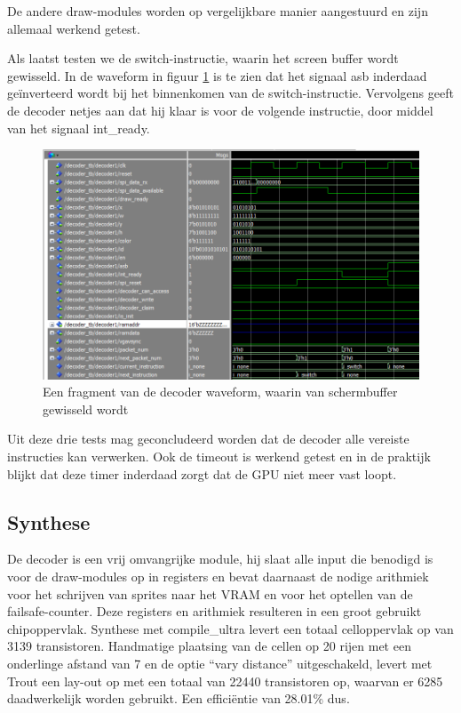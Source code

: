 \documentclass{scrartcl} %
\begin{document}
De andere draw-modules worden op vergelijkbare manier aangestuurd en zijn allemaal werkend getest.

Als laatst testen we de switch-instructie, waarin het screen buffer wordt gewisseld. In de waveform in figuur \ref{fig:decoder-modelsim-switch} is te zien dat het signaal asb inderdaad geïnverteerd wordt bij het binnenkomen van de switch-instructie. Vervolgens geeft de decoder netjes aan dat hij klaar is voor de volgende instructie, door middel van het signaal int\_ready.

\begin{figure}[H]
	\centering
	\includegraphics[width=\textwidth]{resource/decoder-modelsim-switch.png}
	\caption{Een fragment van de decoder waveform, waarin van schermbuffer gewisseld wordt}
	\label{fig:decoder-modelsim-switch}
\end{figure}

Uit deze drie tests mag geconcludeerd worden dat de decoder alle vereiste instructies kan verwerken. Ook de timeout is werkend getest en in de praktijk blijkt dat deze timer inderdaad zorgt dat de GPU niet meer vast loopt.

\subsection{Synthese}
De decoder is een vrij omvangrijke module, hij slaat alle input die benodigd is voor de draw-modules op in registers en bevat daarnaast de nodige arithmiek voor het schrijven van sprites naar het VRAM en voor het optellen van de failsafe-counter. Deze registers en arithmiek resulteren in een groot gebruikt chipoppervlak. Synthese met compile\_ultra levert een totaal celloppervlak op van 3139 transistoren. Handmatige plaatsing van de cellen op 20 rijen met een onderlinge afstand van 7 en de optie ``vary distance'' uitgeschakeld, levert met Trout een lay-out op met een totaal van 22440 transistoren op, waarvan er 6285 daadwerkelijk worden gebruikt. Een efficiëntie van 28.01\% dus.
\end{document}
